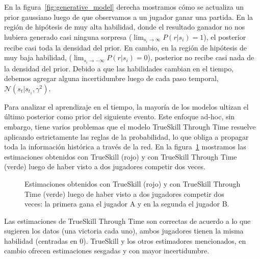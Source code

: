 \documentclass[a4paper,11pt]{book}
\newcommand{\N}{\mathcal{N}}
\theoremstyle{definition}
\begin{document}
%
%
En la figura~\ref{fig:generative_model} derecha mostramos cómo se actualiza un prior gaussiano luego de que observamos a un jugador ganar una partida.
%
En la regi\'on de hip\'otesis de muy alta habilidad, donde el resultado ganador no nos hubiera generado casi ninguna sorpresa ($\lim_{s_i \to \infty}P(r|s_i) = 1$), el posterior recibe casi toda la densidad del prior.
%
En cambio, en la regi\'on de hip\'otesis de muy baja habilidad, ($\lim_{s_i \to -\infty}P(r|s_i) = 0$), posterior no recibe casi nada de la densidad del prior.
%
Debido a que las habilidades cambian en el tiempo, debemos agregar alguna incertidumbre luego de cada paso temporal, $\N(s_t | s_{t_1}, \gamma^2)$.

Para analizar el aprendizaje en el tiempo, la mayoría de los modelos ultizan el último posterior como prior del siguiente evento.
%
Este enfoque ad-hoc, sin embargo, tiene varios problemas que el modelo TrueSkill Through Time resuelve aplicando estrictamente las reglas de la probabilidad, lo que obliga a propagar toda la información histórica a través de la red.
%
En la figura~\ref{fig:trueskillthroughtime} mostramos las estimaciones obtenidos con TrueSkill (rojo) y con TrueSkill Through Time (verde) luego de haber visto a dos jugadores competir dos veces.
%
\begin{figure}[ht!]
\centering
{}
\caption{
 Estimaciones obtenidos con TrueSkill (rojo) y con TrueSkill Through Time (verde) luego de haber visto a dos jugadores competir dos veces: la primera gana el jugador A y en la segunda el jugador B.
}
\label{fig:trueskillthroughtime}
\end{figure}
%
Las estimaciones de TrueSkill Through Time son correctas de acuerdo a lo que sugieren los datos (una victoria cada uno), ambos jugadores tienen la misma habilidad (centradas en 0).
%
TrueSkill y los otros estimadores mencionados, en cambio ofrecen estimaciones sesgadas y con mayor incertidumbre.
\end{document}
